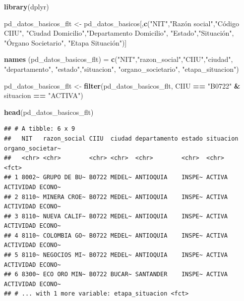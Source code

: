 \documentclass[
  11pt,
]{book}
\newenvironment{Shaded}{\begin{snugshade}}{\end{snugshade}}
\newcommand{\KeywordTok}[1]{\textcolor[rgb]{0.13,0.29,0.53}{\textbf{#1}}}
\newcommand{\NormalTok}[1]{#1}
\newcommand{\OperatorTok}[1]{\textcolor[rgb]{0.81,0.36,0.00}{\textbf{#1}}}
\newcommand{\StringTok}[1]{\textcolor[rgb]{0.31,0.60,0.02}{#1}}
\begin{document}
\begin{Shaded}
\begin{Highlighting}[]
\KeywordTok{library}\NormalTok{(dplyr)}

\NormalTok{pd_datos_basicos_flt <-}\StringTok{ }\NormalTok{pd_datos_basicos[,}\KeywordTok{c}\NormalTok{(}\StringTok{"NIT"}\NormalTok{,}\StringTok{"Razón social"}\NormalTok{,}\StringTok{"Código CIIU"}\NormalTok{,}
      \StringTok{"Ciudad Domicilio"}\NormalTok{,}\StringTok{"Departamento Domicilio"}\NormalTok{, }\StringTok{"Estado"}\NormalTok{,}\StringTok{"Situación", }
\StringTok{      "}\NormalTok{Órgano Societario}\StringTok{", "}\NormalTok{Etapa Situación")]}

\KeywordTok{names}\NormalTok{ (pd_datos_basicos_flt) =}\StringTok{ }\KeywordTok{c}\NormalTok{(}\StringTok{"NIT"}\NormalTok{,}\StringTok{"razon_social"}\NormalTok{,}\StringTok{"CIIU"}\NormalTok{,}\StringTok{"ciudad"}\NormalTok{,}
                                 \StringTok{"departamento"}\NormalTok{, }\StringTok{"estado"}\NormalTok{,}\StringTok{"situacion"}\NormalTok{, }
                                 \StringTok{"organo_societario"}\NormalTok{, }\StringTok{"etapa_situacion"}\NormalTok{)}

\NormalTok{pd_datos_basicos_flt <-}\StringTok{ }\KeywordTok{filter}\NormalTok{(pd_datos_basicos_flt, CIIU }\OperatorTok{==}\StringTok{ "B0722"} \OperatorTok{&}\StringTok{ }
\StringTok{                                 }\NormalTok{situacion }\OperatorTok{==}\StringTok{ "ACTIVA"}\NormalTok{)}

\KeywordTok{head}\NormalTok{(pd_datos_basicos_flt)}
\end{Highlighting}
\end{Shaded}

\begin{verbatim}
## # A tibble: 6 x 9
##   NIT   razon_social CIIU  ciudad departamento estado situacion organo_societar~
##   <chr> <chr>        <chr> <chr>  <chr>        <chr>  <chr>     <fct>           
## 1 8002~ GRUPO DE BU~ B0722 MEDEL~ ANTIOQUIA    INSPE~ ACTIVA    ACTIVIDAD ECONO~
## 2 8110~ MINERA CROE~ B0722 MEDEL~ ANTIOQUIA    INSPE~ ACTIVA    ACTIVIDAD ECONO~
## 3 8110~ NUEVA CALIF~ B0722 MEDEL~ ANTIOQUIA    INSPE~ ACTIVA    ACTIVIDAD ECONO~
## 4 8110~ COLOMBIA GO~ B0722 MEDEL~ ANTIOQUIA    INSPE~ ACTIVA    ACTIVIDAD ECONO~
## 5 8110~ NEGOCIOS MI~ B0722 MEDEL~ ANTIOQUIA    INSPE~ ACTIVA    ACTIVIDAD ECONO~
## 6 8300~ ECO ORO MIN~ B0722 BUCAR~ SANTANDER    INSPE~ ACTIVA    ACTIVIDAD ECONO~
## # ... with 1 more variable: etapa_situacion <fct>
\end{verbatim}
\end{document}
